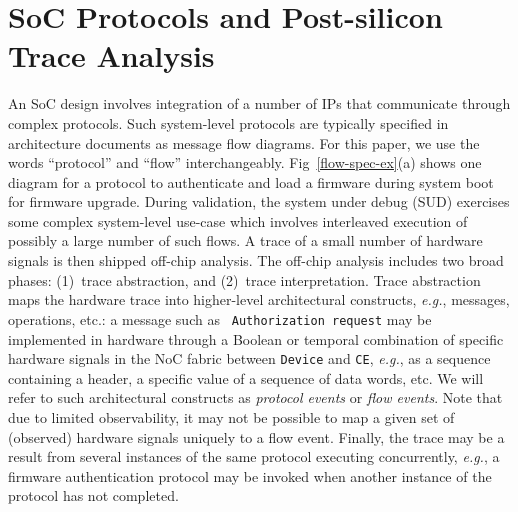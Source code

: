 \documentclass[12pt,frontmatter,copyright,thesis]{usfmanus}
\newcommand{\eg}{\mbox{{\em e.g.}}}
\begin{document}
\section{SoC Protocols and Post-silicon Trace Analysis}
An SoC design involves integration of a number of IPs that
communicate through complex protocols.  Such system-level
protocols are typically specified in architecture documents
as message flow diagrams.  For this paper, we use the words
``protocol'' and ``flow'' interchangeably.
Fig~\ref{flow-spec-ex}(a) shows one diagram for a protocol
to authenticate and load a firmware during system boot for
firmware upgrade.  During validation, the system under debug
(SUD) exercises some complex system-level use-case which
involves interleaved execution of possibly a large number of
such flows.  A trace of a small number of hardware signals
is then shipped off-chip analysis.  The off-chip analysis
includes two broad phases: (1)~trace abstraction, and
(2)~trace interpretation.  Trace abstraction maps the
hardware trace into higher-level architectural constructs,
\eg, messages, operations, etc.: a message such as {\tt
  Authorization request} may be implemented in hardware
through a Boolean or temporal combination of specific
hardware signals in the NoC fabric between {\tt Device} and
{\tt CE}, \eg, as a sequence containing a header, a specific
value of a sequence of data words, etc.  We will refer to
such architectural constructs as {\em protocol events} or
{\em flow events}.  Note that due to limited observability,
it may not be possible to map a given set of (observed)
hardware signals uniquely to a flow event.  Finally, the
trace may be a result from several instances of the same
protocol executing concurrently, \eg, a firmware
authentication protocol may be invoked when another instance
of the protocol has not completed.
\end{document}
